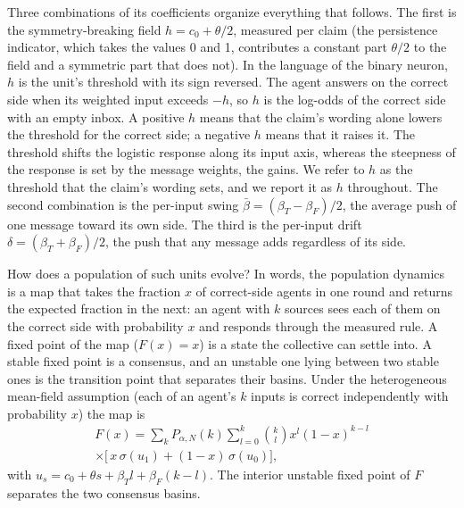 \documentclass{ieeeaccess}
\begin{document}
Three combinations of its coefficients organize everything that follows.
The first is the symmetry-breaking field $h = c_0 + \theta/2$, measured
per claim (the persistence indicator, which takes the values 0 and 1,
contributes a constant part $\theta/2$ to the field and a symmetric part
that does not). In the language of the binary neuron, $h$ is the unit's
threshold with its sign reversed. The agent answers on the correct side
when its weighted input exceeds $-h$, so $h$ is the log-odds of the correct
side with an empty inbox. A positive $h$ means that the claim's wording
alone lowers the threshold for the correct side; a negative $h$ means that
it raises it. The threshold shifts the logistic response along its input
axis, whereas the steepness of the response is set by the message weights,
the gains. We refer to $h$ as the threshold that the claim's wording sets,
and we report it as $h$ throughout. The second combination is the
per-input swing $\bar\beta = (\beta_T - \beta_F)/2$, the average push of
one message toward its own side. The third is the per-input drift
$\delta = (\beta_T + \beta_F)/2$, the push that any message adds regardless
of its side.

How does a population of such units evolve? In words, the population
dynamics is a map that takes the fraction $x$ of correct-side agents in one
round and returns the expected fraction in the next: an agent with $k$
sources sees each of them on the correct side with probability $x$ and
responds through the measured rule. A fixed point of the map ($F(x) = x$)
is a state the collective can settle into. A stable fixed point is a
consensus, and an unstable one lying between two stable ones is the
transition point that separates their basins. Under the heterogeneous
mean-field assumption (each of an agent's $k$ inputs is correct
independently with probability $x$) the map is
\begin{equation}
\begin{split}
F(x) = \sum_{k} P_{\alpha,N}(k) \sum_{l=0}^{k} \binom{k}{l}
x^{l} (1-x)^{k-l} \\ \times \bigl[\, x\,\sigma(u_{1}) + (1-x)\,\sigma(u_{0})
\bigr],
\end{split}
\label{eq:hmfmap}
\end{equation}
with $u_{s} = c_0 + \theta s + \beta_T l + \beta_F (k-l)$. The interior
unstable fixed point of $F$ separates the two consensus basins.
\end{document}
